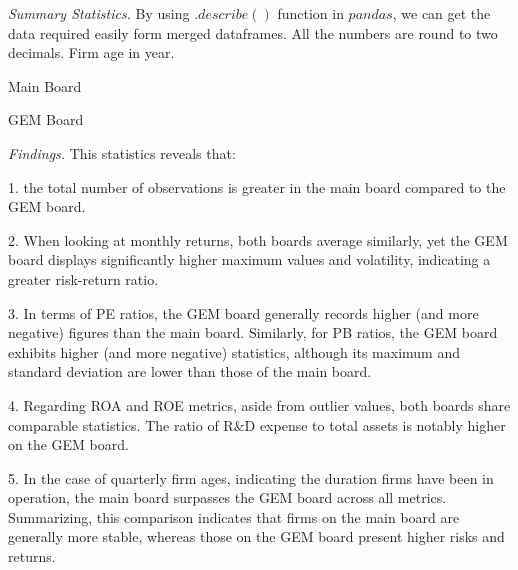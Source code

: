 \noindent
\begin{Question} 


\textit{Summary Statistics.} By using $.describe()$ function in $pandas$, we can get the data required easily form merged dataframes. All the numbers are round to two decimals. Firm age in year.

\begin{table}[htbp]
    \centering
    \caption{Main Board}
    \vspace{0.4cm}
\end{table}

\begin{table}[htbp]
    \centering
    \caption{GEM Board}
    \vspace{0.4cm}
\end{table}

\textit{Findings.} This statistics reveals that:


1. the total number of observations is greater in the main board compared to the GEM board. 


2. When looking at monthly returns, both boards average similarly, yet the GEM board displays significantly higher maximum values and volatility, indicating a greater risk-return ratio. 


3. In terms of PE ratios, the GEM board generally records higher (and more negative) figures than the main board. Similarly, for PB ratios, the GEM board exhibits higher (and more negative) statistics, although its maximum and standard deviation are lower than those of the main board. 


4. Regarding ROA and ROE metrics, aside from outlier values, both boards share comparable statistics. The ratio of R\&D expense to total assets is notably higher on the GEM board. 


5. In the case of quarterly firm ages, indicating the duration firms have been in operation, the main board surpasses the GEM board across all metrics. Summarizing, this comparison indicates that firms on the main board are generally more stable, whereas those on the GEM board present higher risks and returns.


\end{Question}